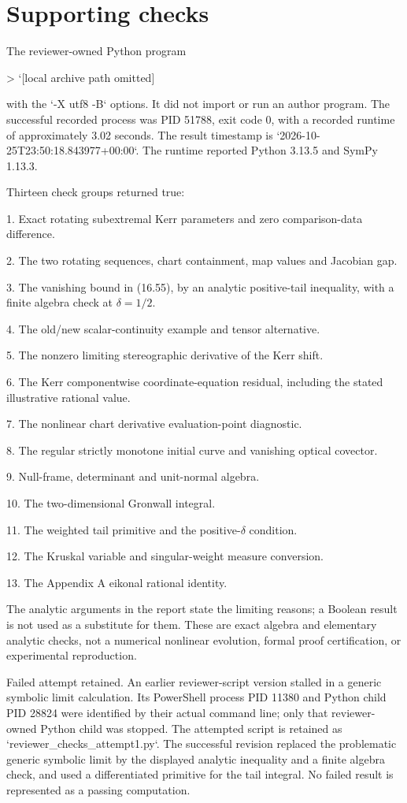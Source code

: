 \documentclass[10pt]{article}
\begin{document}
\section*{Supporting checks}
The reviewer-owned Python program\par
> `[local archive path omitted]\par
with the `-X utf8 -B` options. It did not import or run an author program. The successful recorded process was PID 51788, exit code 0, with a recorded runtime of approximately 3.02 seconds. The result timestamp is `2026-10-25T23:50:18.843977+00:00`. The runtime reported Python 3.13.5 and SymPy 1.13.3.\par
Thirteen check groups returned true:\par
1. Exact rotating subextremal Kerr parameters and zero comparison-data difference.\par
2. The two rotating sequences, chart containment, map values and Jacobian gap.\par
3. The vanishing bound in (16.55), by an analytic positive-tail inequality, with a finite algebra check at \(\delta=1/2\).\par
4. The old/new scalar-continuity example and tensor alternative.\par
5. The nonzero limiting stereographic derivative of the Kerr shift.\par
6. The Kerr componentwise coordinate-equation residual, including the stated illustrative rational value.\par
7. The nonlinear chart derivative evaluation-point diagnostic.\par
8. The regular strictly monotone initial curve and vanishing optical covector.\par
9. Null-frame, determinant and unit-normal algebra.\par
10. The two-dimensional Gronwall integral.\par
11. The weighted tail primitive and the positive-\(\delta\) condition.\par
12. The Kruskal variable and singular-weight measure conversion.\par
13. The Appendix A eikonal rational identity.\par
The analytic arguments in the report state the limiting reasons; a Boolean result is not used as a substitute for them. These are exact algebra and elementary analytic checks, not a numerical nonlinear evolution, formal proof certification, or experimental reproduction.\par
Failed attempt retained. An earlier reviewer-script version stalled in a generic symbolic limit calculation. Its PowerShell process PID 11380 and Python child PID 28824 were identified by their actual command line; only that reviewer-owned Python child was stopped. The attempted script is retained as `reviewer\_checks\_attempt1.py`. The successful revision replaced the problematic generic symbolic limit by the displayed analytic inequality and a finite algebra check, and used a differentiated primitive for the tail integral. No failed result is represented as a passing computation.\par
\end{document}
